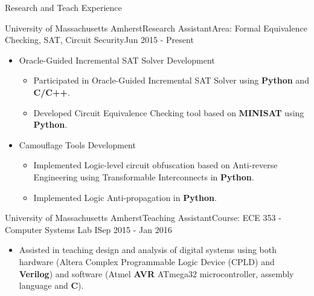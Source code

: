 \documentclass{resume} %
\begin{document}
\begin{rSection}{Research and Teach Experience}\itemsep 2pt

\begin{rSubsection}{University of Massachusetts Amherst}{Research Assistant}{Area: Formal Equivalence Checking, SAT, Circuit Security}{Jun 2015 - Present}\itemsep -1pt
\item
	\begin{itemize}\itemsep -3pt
    
    	\item Oracle-Guided Incremental SAT Solver Development   
\begin{itemize}
		\item Participated in Oracle-Guided Incremental SAT Solver using \textbf{Python} and \textbf{C/C++}.\par
		\item Developed Circuit Equivalence Checking tool based on \textbf{MINISAT} using \textbf{Python}.\par 
\end{itemize}

	\item Camouflage Tools Development
\begin{itemize}
		\item Implemented Logic-level circuit obfuscation based on Anti-reverse Engineering using Transformable Interconnects in \textbf{Python}.\par
		\item Implemented Logic Anti-propagation in \textbf{Python}.\par		
\end{itemize} 

	\end{itemize}

\end{rSubsection}



\begin{rSubsection}{University of Massachusetts Amherst}{Teaching Assistant}{Course: ECE 353 - Computer Systems Lab I}{Sep 2015 - Jan 2016}\itemsep -4pt
\item 
\begin{itemize}
\item Assisted in teaching design and analysis of digital systems using both hardware (Altera Complex Programmable Logic Device (CPLD) and \textbf{Verilog}) and software (Atmel \textbf{AVR}  ATmega32 microcontroller, assembly language and \textbf{C}).
\end{itemize}

\end{rSubsection}

\end{rSection}
\end{document}
